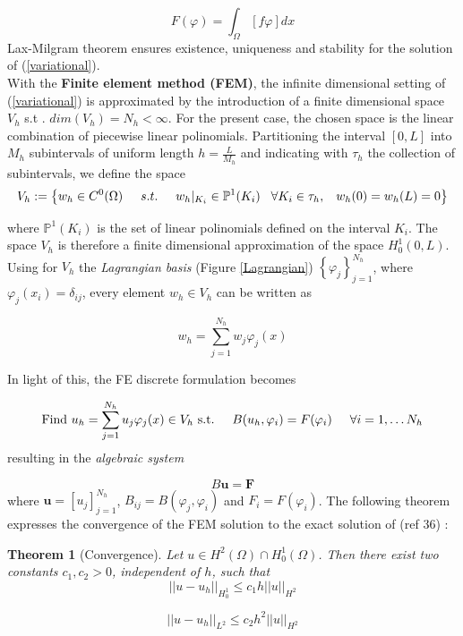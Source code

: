 \documentclass[12pt, a4paper]{report}
\newtheorem{theorem}{Theorem}[section]
\begin{document}
\begin{enumerate}
	\begin{equation}
	F(\varphi) = \int_{\Omega} \left[f \varphi\right] dx
	\end{equation}
	Lax-Milgram theorem \cite{40} ensures existence, uniqueness and stability for the solution of (\ref{variational}).\\
	With the \textbf{Finite element method (FEM)}, the infinite dimensional setting of (\ref{variational}) is approximated by the introduction of a finite dimensional space $V_h$ s.t . $dim(V_h) = N_h < \infty$. For the present case, the chosen space is the linear combination of piecewise linear polinomials. Partitioning the interval $[0,L]$ into $M_h$ subintervals of uniform length $ h = \frac{L}{M_h}$ and indicating with $\tau_h$ the collection of subintervals, we define the space
	$$ V_h := \left\{ w_h\in C^0(\Omega) \hspace{0.5 cm} s.t. \hspace{0.5 cm} w_h|_{K_i} \in \mathbb{P}^1(K_i) \hspace{0.3 cm} \forall K_i \in \tau_h, \hspace{0.3 cm} w_h(0)=w_h(L)=0 \right\}$$
	
	where $ \mathbb{P}^1(K_i)$ is the set of linear polinomials defined on the interval $K_i$. The space $V_h$ is therefore a finite dimensional approximation of the space $H_0^1(0,L)$. Using for $V_h$ the \textit{Lagrangian basis} (Figure \ref{Lagrangian}) $ \left\{ \varphi _j \right\}_{j=1}^{N_h}$, where $ \varphi_j(x_i) = \delta_{ij}$, every element $w_h \in V_h$ can be written as
	
	\begin{equation}
	w_h = \sum_{j=1}^{N_h} w_j \varphi_j(x)
	\end{equation}
	
	In light of this, the FE discrete formulation becomes
	
	\begin{equation}
	\text{Find $u_h = \sum_{j=1}^{N_h} u_j \varphi_j(x) \in V_h$ s.t.} \hspace{0.5cm} B(u_h,\varphi_i) = F(\varphi_i) \hspace{0.5cm} \forall i = 1, \dots N_h
	\end{equation}
	resulting in the \textit{algebraic system}
	
	\begin{equation}
	B \textbf{u} = \textbf{F} \label{algebraic}
	\end{equation}
	where $\textbf{u} = [u_j]_{j=1}^{N_h}$, $B_{ij} = B(\varphi_j,\varphi_i)$ and $F_i = F(\varphi_i)$. The following theorem expresses the convergence of the FEM solution to the exact solution of (ref 36) \cite{40}:
	\begin{theorem}[Convergence]
		Let $u \in H^2(\Omega) \cap H_0^1(\Omega)$. Then there exist two constants $c_1,c_2 >0$, independent of $h$, such that
		$$||u-u_h||_{H_0^1} \le c_1h||u||_{H^2}$$
		
		$$||u-u_h||_{L^2} \le c_2h^2||u||_{H^2}$$
	\end{theorem}
\end{enumerate}
\end{document}
